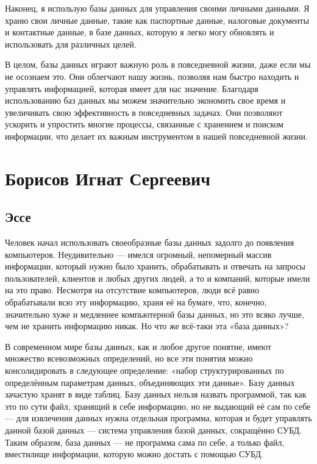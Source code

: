 \documentclass[14pt]{extreport}
\begin{document}
Наконец, я использую базы данных для управления своими личными данными. Я храню свои личные данные, такие как паспортные данные, налоговые документы и контактные данные, в базе данных, которую я легко могу обновлять и использовать для различных целей. 

В целом, базы данных играют важную роль в повседневной жизни, даже если мы не осознаем это. Они облегчают нашу жизнь, позволяя нам быстро находить и управлять информацией, которая имеет для нас значение. Благодаря использованию баз данных мы можем значительно экономить свое время и увеличивать свою эффективность в повседневных задачах. Они позволяют ускорить и упростить многие процессы, связанные с хранением и поиском информации, что делает их важным инструментом в нашей повседневной жизни.

\section{Борисов Игнат Сергеевич}

\subsection{Эссе}

Человек начал использовать своеобразные базы данных задолго до появления компьютеров. Неудивительно — имелся огромный, непомерный массив информации, который нужно было хранить, обрабатывать и отвечать на запросы пользователей, клиентов и любых других людей, а то и компаний, которые имели на это право. Несмотря на отсутствие компьютеров, люди всё равно обрабатывали всю эту информацию, храня её на бумаге, что, конечно, значительно хуже и медленнее компьютерной базы данных, но это всяко лучше, чем не хранить информацию никак. Но что же всё-таки эта «база данных»?

В современном мире базы данных, как и любое другое понятие, имеют множество всевозможных определений, но все эти понятия можно консолидировать в следующее определение: «набор структурированных по определённым параметрам данных, объединяющих эти данные». Базу данных зачастую хранят в виде таблиц. Базу данных нельзя назвать программой, так как это по сути файл, хранящий в себе информацию, но не выдающий её сам по себе — для извлечения данных нужна отдельная программа, которая и будет управлять данной базой данных — система управления базой данных, сокращённо СУБД. Таким образом, база данных — не программа сама по себе, а только файл, вместилище информации, которую можно достать с помощью СУБД.
\end{document}
